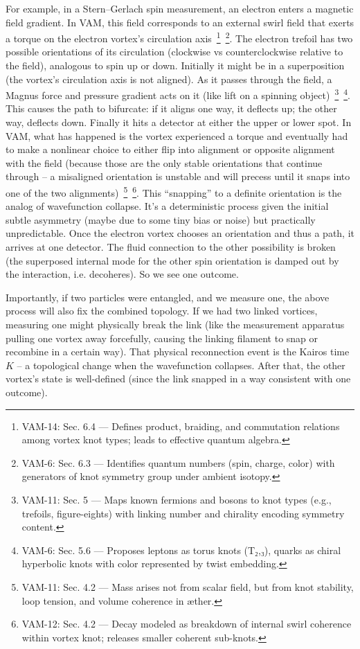 \documentclass[a4paper,12pt]{article}
\begin{document}
    For example, in a Stern–Gerlach spin measurement, an electron enters a magnetic field gradient. In VAM, this field corresponds to an external swirl field that exerts a torque on the electron vortex’s circulation axis~\footnote{VAM-14: Sec. 6.4 — Defines product, braiding, and commutation relations among vortex knot types; leads to effective quantum algebra.}~\footnote{VAM-6: Sec. 6.3 — Identifies quantum numbers (spin, charge, color) with generators of knot symmetry group under ambient isotopy.}. The electron trefoil has two possible orientations of its circulation (clockwise vs counterclockwise relative to the field), analogous to spin up or down. Initially it might be in a superposition (the vortex’s circulation axis is not aligned). As it passes through the field, a Magnus force and pressure gradient acts on it (like lift on a spinning object)~\footnote{VAM-11: Sec. 5 — Maps known fermions and bosons to knot types (e.g., trefoils, figure-eights) with linking number and chirality encoding symmetry content.}~\footnote{VAM-6: Sec. 5.6 — Proposes leptons as torus knots (T₂,₃), quarks as chiral hyperbolic knots with color represented by twist embedding.}. This causes the path to bifurcate: if it aligns one way, it deflects up; the other way, deflects down. Finally it hits a detector at either the upper or lower spot. In VAM, what has happened is the vortex experienced a torque and eventually had to make a nonlinear choice to either flip into alignment or opposite alignment with the field (because those are the only stable orientations that continue through – a misaligned orientation is unstable and will precess until it snaps into one of the two alignments)~\footnote{VAM-11: Sec. 4.2 — Mass arises not from scalar field, but from knot stability, loop tension, and volume coherence in æther.}~\footnote{VAM-12: Sec. 4.2 — Decay modeled as breakdown of internal swirl coherence within vortex knot; releases smaller coherent sub-knots.}. This “snapping” to a definite orientation is the analog of wavefunction collapse. It’s a deterministic process given the initial subtle asymmetry (maybe due to some tiny bias or noise) but practically unpredictable. Once the electron vortex chooses an orientation and thus a path, it arrives at one detector. The fluid connection to the other possibility is broken (the superposed internal mode for the other spin orientation is damped out by the interaction, i.e. decoheres). So we see one outcome.

    Importantly, if two particles were entangled, and we measure one, the above process will also fix the combined topology. If we had two linked vortices, measuring one might physically break the link (like the measurement apparatus pulling one vortex away forcefully, causing the linking filament to snap or recombine in a certain way). That physical reconnection event is the Kairos time $K$ – a topological change when the wavefunction collapses. After that, the other vortex’s state is well-defined (since the link snapped in a way consistent with one outcome).
\end{document}
